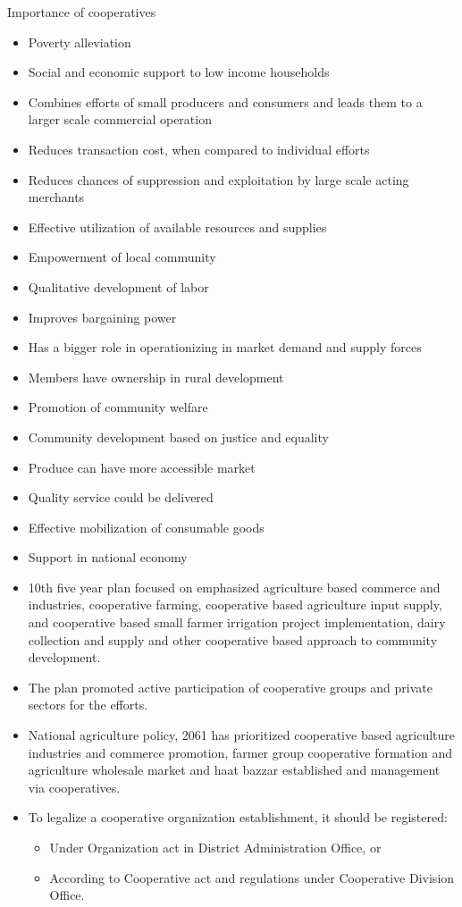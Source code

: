 \documentclass[
]{book}
\providecommand{\tightlist}{%
  \setlength{\itemsep}{0pt}\setlength{\parskip}{0pt}}
\begin{document}
Importance of cooperatives

\begin{itemize}
\item
  Poverty alleviation
\item
  Social and economic support to low income households
\item
  Combines efforts of small producers and consumers and leads them to a larger scale commercial operation
\item
  Reduces transaction cost, when compared to individual efforts
\item
  Reduces chances of suppression and exploitation by large scale acting merchants
\item
  Effective utilization of available resources and supplies
\item
  Empowerment of local community
\item
  Qualitative development of labor
\item
  Improves bargaining power
\item
  Has a bigger role in operationizing in market demand and supply forces
\item
  Members have ownership in rural development
\item
  Promotion of community welfare
\item
  Community development based on justice and equality
\item
  Produce can have more accessible market
\item
  Quality service could be delivered
\item
  Effective mobilization of consumable goods
\item
  Support in national economy
\item
  10th five year plan focused on emphasized agriculture based commerce and industries, cooperative farming, cooperative based agriculture input supply, and cooperative based small farmer irrigation project implementation, dairy collection and supply and other cooperative based approach to community development.
\item
  The plan promoted active participation of cooperative groups and private sectors for the efforts.
\item
  National agriculture policy, 2061 has prioritized cooperative based agriculture industries and commerce promotion, farmer group cooperative formation and agriculture wholesale market and haat bazzar established and management via cooperatives.
\item
  To legalize a cooperative organization establishment, it should be registered:

  \begin{itemize}
  \tightlist
  \item
    Under Organization act in District Administration Office, or
  \item
    According to Cooperative act and regulations under Cooperative Division Office.
  \end{itemize}
\end{itemize}
\end{document}
